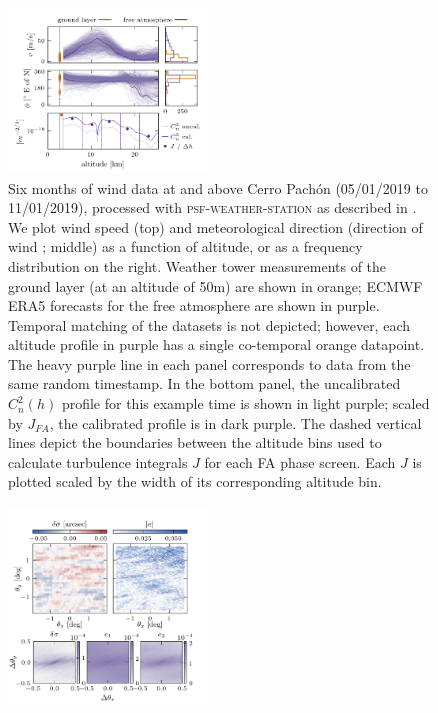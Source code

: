 \documentclass[twocolumn]{aastex631}
\newcommand{\psfws}{\textsc{psf-weather-station}\xspace}
\begin{document}
\begin{figure}
\includegraphics[width=0.47\textwidth]{f2_inputs.png}
\caption{Six months of wind data at and above Cerro Pach\'on (05/01/2019 to 11/01/2019), processed with \psfws as described in .
We plot wind speed (top) and meteorological direction (direction of wind ; middle) as a function of altitude, or as a frequency distribution on the right. 
Weather tower measurements of the ground layer (at an altitude of 50\unit{m}) are shown in orange; ECMWF ERA5 forecasts for the free atmosphere are shown in purple.
Temporal matching of the datasets is not depicted; however, each altitude profile in purple has a single co-temporal orange datapoint.
The heavy purple line in each panel corresponds to data from the same random timestamp.
In the bottom panel, the uncalibrated $C_n^2(h)$ profile for this example time is shown in light purple; scaled by $J_{FA}$, the calibrated profile is in dark purple. 
The dashed vertical lines depict the boundaries between the altitude bins used to calculate turbulence integrals $J$ for each FA phase screen.
Each $J$ is plotted scaled by the width of its corresponding altitude bin.
    \label{fig:inputs}
}

\end{figure}

\begin{figure}
\includegraphics[width=0.47\textwidth]{f3_output.png}
\caption{
    \label{fig:output}
    }
\end{figure}
\end{document}
